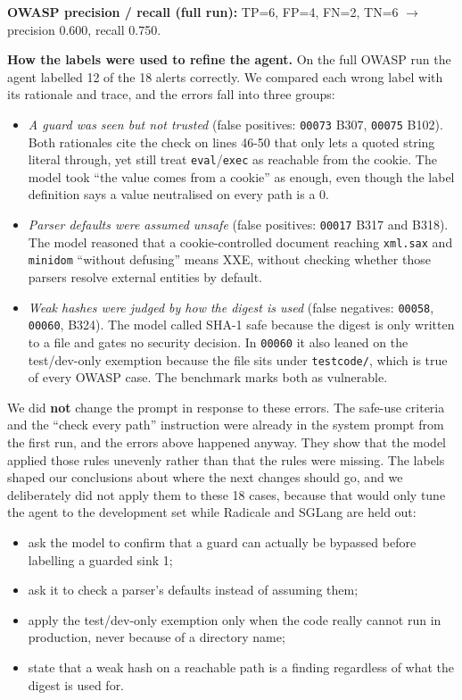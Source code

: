 \documentclass[
  10pt,
]{article}
\providecommand{\tightlist}{%
  \setlength{\itemsep}{0pt}\setlength{\parskip}{0pt}}
\begin{document}
\textbf{OWASP precision / recall (full run):} TP=6, FP=4, FN=2, TN=6 \ensuremath{\rightarrow}
precision 0.600, recall 0.750.

\textbf{How the labels were used to refine the agent.} On the full OWASP
run the agent labelled 12 of the 18 alerts correctly. We compared each
wrong label with its rationale and trace, and the errors fall into three
groups:

\begin{itemize}
\tightlist
\item
  \emph{A guard was seen but not trusted} (false positives:
  \texttt{00073} B307, \texttt{00075} B102). Both rationales cite the
  check on lines 46-50 that only lets a quoted string literal through,
  yet still treat \texttt{eval}/\texttt{exec} as reachable from the
  cookie. The model took ``the value comes from a cookie'' as enough,
  even though the label definition says a value neutralised on every
  path is a 0.
\item
  \emph{Parser defaults were assumed unsafe} (false positives:
  \texttt{00017} B317 and B318). The model reasoned that a
  cookie-controlled document reaching \texttt{xml.sax} and
  \texttt{minidom} ``without defusing'' means XXE, without checking
  whether those parsers resolve external entities by default.
\item
  \emph{Weak hashes were judged by how the digest is used} (false
  negatives: \texttt{00058}, \texttt{00060}, B324). The model called
  SHA-1 safe because the digest is only written to a file and gates no
  security decision. In \texttt{00060} it also leaned on the
  test/dev-only exemption because the file sits under
  \texttt{testcode/}, which is true of every OWASP case. The benchmark
  marks both as vulnerable.
\end{itemize}

We did \textbf{not} change the prompt in response to these errors. The
safe-use criteria and the ``check every path'' instruction were already
in the system prompt from the first run, and the errors above happened
anyway. They show that the model applied those rules unevenly rather
than that the rules were missing. The labels shaped our conclusions
about where the next changes should go, and we deliberately did not
apply them to these 18 cases, because that would only tune the agent to
the development set while Radicale and SGLang are held out:

\begin{itemize}
\tightlist
\item
  ask the model to confirm that a guard can actually be bypassed before
  labelling a guarded sink 1;
\item
  ask it to check a parser's defaults instead of assuming them;
\item
  apply the test/dev-only exemption only when the code really cannot run
  in production, never because of a directory name;
\item
  state that a weak hash on a reachable path is a finding regardless of
  what the digest is used for.
\end{itemize}
\end{document}
